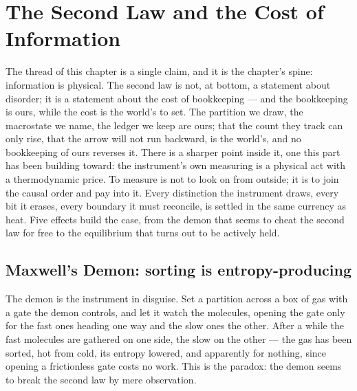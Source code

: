 \chapter{The Second Law and the Cost of Information}
\label{chap:second-law-cost-of-information}

The thread of this chapter is a single claim, and it is the chapter's spine: information is physical. The
second law is not, at bottom, a statement about disorder; it is a statement about the cost of bookkeeping ---
and the bookkeeping is ours, while the cost is the world's to set. The partition we draw, the macrostate we
name, the ledger we keep are ours; that the count they track can only rise, that the arrow will not run
backward, is the world's, and no bookkeeping of ours reverses it. There is a sharper point inside it, one this
part has been building toward: the instrument's own measuring is a physical act with a thermodynamic price. To
measure is not to look on from outside; it is to join the causal order and pay into it. Every distinction the
instrument draws, every bit it erases, every boundary it must reconcile, is settled in the same currency as
heat. Five effects build the case, from the demon that seems to cheat the second law for free to the
equilibrium that turns out to be actively held.

\section{Maxwell's Demon: sorting is entropy-producing}
\label{se:maxwell-demon}

The demon is the instrument in disguise. Set a partition across a box of gas with a gate the demon controls,
and let it watch the molecules, opening the gate only for the fast ones heading one way and the slow ones the
other. After a while the fast molecules are gathered on one side, the slow on the other --- the gas has been
sorted, hot from cold, its entropy lowered, and apparently for nothing, since opening a frictionless gate
costs no work. This is the paradox: the demon seems to break the second law by mere observation.

